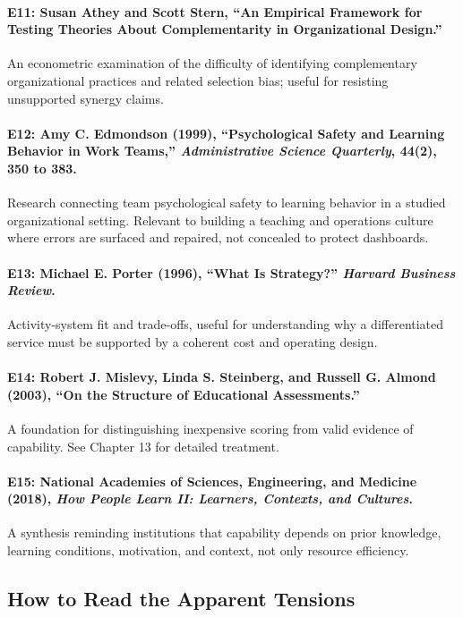 \paragraph*{E11: Susan Athey and Scott Stern, ``An Empirical Framework for Testing Theories About Complementarity in Organizational Design.''} An econometric examination of the difficulty of identifying complementary organizational practices and related selection bias; useful for resisting unsupported synergy claims.

\paragraph*{E12: Amy C. Edmondson (1999), ``Psychological Safety and Learning Behavior in Work Teams,'' \emph{Administrative Science Quarterly}, 44(2), 350 to 383.} Research connecting team psychological safety to learning behavior in a studied organizational setting. Relevant to building a teaching and operations culture where errors are surfaced and repaired, not concealed to protect dashboards.

\paragraph*{E13: Michael E. Porter (1996), ``What Is Strategy?'' \emph{Harvard Business Review}.} Activity-system fit and trade-offs, useful for understanding why a differentiated service must be supported by a coherent cost and operating design.

\paragraph*{E14: Robert J. Mislevy, Linda S. Steinberg, and Russell G. Almond (2003), ``On the Structure of Educational Assessments.''} A foundation for distinguishing inexpensive scoring from valid evidence of capability. See Chapter 13 for detailed treatment.

\paragraph*{E15: National Academies of Sciences, Engineering, and Medicine (2018), \emph{How People Learn II: Learners, Contexts, and Cultures}.} A synthesis reminding institutions that capability depends on prior knowledge, learning conditions, motivation, and context, not only resource efficiency.

\subsection*{How to Read the Apparent Tensions}

